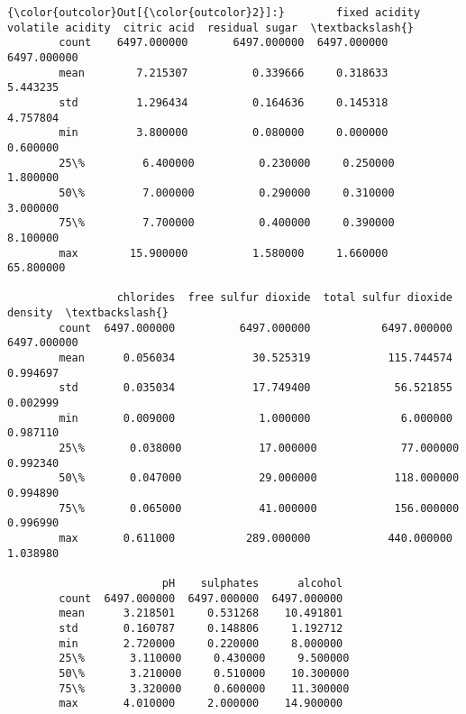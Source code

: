 \documentclass[11pt]{article}
\begin{document}
\begin{Verbatim}[commandchars=\\\{\}]
{\color{outcolor}Out[{\color{outcolor}2}]:}        fixed acidity  volatile acidity  citric acid  residual sugar  \textbackslash{}
        count    6497.000000       6497.000000  6497.000000     6497.000000   
        mean        7.215307          0.339666     0.318633        5.443235   
        std         1.296434          0.164636     0.145318        4.757804   
        min         3.800000          0.080000     0.000000        0.600000   
        25\%         6.400000          0.230000     0.250000        1.800000   
        50\%         7.000000          0.290000     0.310000        3.000000   
        75\%         7.700000          0.400000     0.390000        8.100000   
        max        15.900000          1.580000     1.660000       65.800000   
        
                 chlorides  free sulfur dioxide  total sulfur dioxide      density  \textbackslash{}
        count  6497.000000          6497.000000           6497.000000  6497.000000   
        mean      0.056034            30.525319            115.744574     0.994697   
        std       0.035034            17.749400             56.521855     0.002999   
        min       0.009000             1.000000              6.000000     0.987110   
        25\%       0.038000            17.000000             77.000000     0.992340   
        50\%       0.047000            29.000000            118.000000     0.994890   
        75\%       0.065000            41.000000            156.000000     0.996990   
        max       0.611000           289.000000            440.000000     1.038980   
        
                        pH    sulphates      alcohol  
        count  6497.000000  6497.000000  6497.000000  
        mean      3.218501     0.531268    10.491801  
        std       0.160787     0.148806     1.192712  
        min       2.720000     0.220000     8.000000  
        25\%       3.110000     0.430000     9.500000  
        50\%       3.210000     0.510000    10.300000  
        75\%       3.320000     0.600000    11.300000  
        max       4.010000     2.000000    14.900000  
\end{Verbatim}
            
\end{document}
